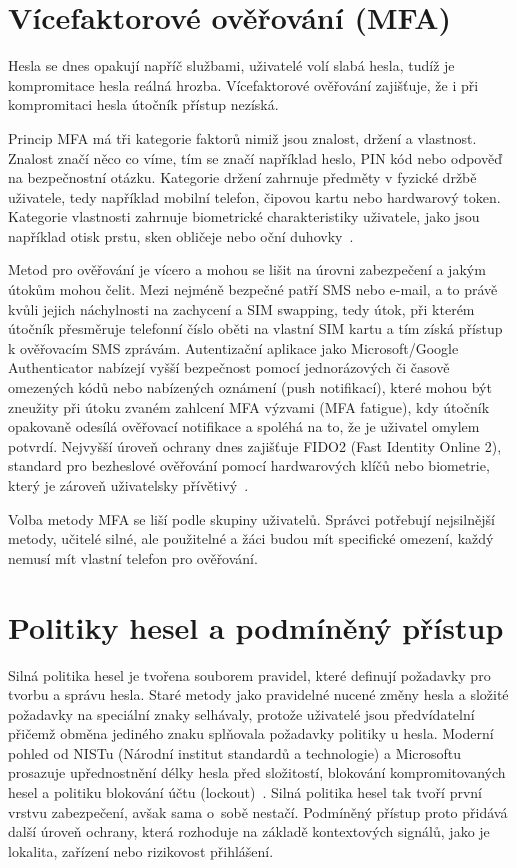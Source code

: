\documentclass[male,czech,api_bc]{kitheses}
\begin{document}
\section{Vícefaktorové ověřování (MFA)}
Hesla se dnes opakují napříč službami, uživatelé volí slabá hesla, tudíž je kompromitace hesla reálná hrozba. Vícefaktorové ověřování zajišťuje, že i při kompromitaci hesla útočník přístup nezíská.

Princip MFA má tři kategorie faktorů nimiž jsou znalost, držení a vlastnost. Znalost značí něco co víme, tím se značí například heslo, PIN kód nebo odpověď na bezpečnostní otázku. Kategorie držení zahrnuje předměty v fyzické držbě uživatele, tedy například mobilní telefon, čipovou kartu nebo hardwarový token. Kategorie vlastnosti zahrnuje biometrické charakteristiky uživatele, jako jsou například otisk prstu, sken obličeje nebo oční duhovky~\cite{NIST_SP800634}.

Metod pro ověřování je vícero a mohou se lišit na úrovni zabezpečení a jakým útokům mohou čelit. Mezi nejméně bezpečné patří SMS nebo e-mail, a to právě kvůli jejich náchylnosti na zachycení a SIM swapping, tedy útok, při kterém útočník přesměruje telefonní číslo oběti na vlastní SIM kartu a tím získá přístup k ověřovacím SMS zprávám. Autentizační aplikace jako Microsoft/Google Authenticator nabízejí vyšší bezpečnost pomocí jednorázových či časově omezených kódů nebo nabízených oznámení (push notifikací), které mohou být zneužity při útoku zvaném zahlcení MFA výzvami (MFA fatigue), kdy útočník opakovaně odesílá ověřovací notifikace a spoléhá na to, že je uživatel omylem potvrdí. Nejvyšší úroveň ochrany dnes zajišťuje FIDO2 (Fast Identity Online 2), standard pro bezheslové ověřování pomocí hardwarových klíčů nebo biometrie, který je zároveň uživatelsky přívětivý~\cite{MicrosoftFIDO2,MicrosoftEntra2025}.

Volba metody MFA se liší podle skupiny uživatelů. Správci potřebují nejsilnější metody, učitelé silné, ale použitelné a žáci budou mít specifické omezení, každý nemusí mít vlastní telefon pro ověřování.

\section{Politiky hesel a podmíněný přístup}
Silná politika hesel je tvořena souborem pravidel, které definují požadavky pro tvorbu a správu hesla. Staré metody jako pravidelné nucené změny hesla a složité požadavky na speciální znaky selhávaly, protože uživatelé jsou předvídatelní přičemž obměna jediného znaku splňovala požadavky politiky u hesla. Moderní pohled od NISTu (Národní institut standardů a technologie) a Microsoftu prosazuje upřednostnění délky hesla před složitostí, blokování kompromitovaných hesel a politiku blokování účtu (lockout)~\cite{NIST_SP800634}. Silná politika hesel tak tvoří první vrstvu zabezpečení, avšak sama o~sobě nestačí. Podmíněný přístup proto přidává další úroveň ochrany, která rozhoduje na základě kontextových signálů, jako je lokalita, zařízení nebo rizikovost přihlášení.
\end{document}
